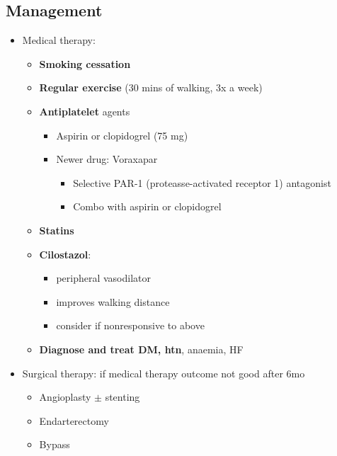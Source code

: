 \documentclass[
  12pt,
]{memoir}
\providecommand{\tightlist}{%
  \setlength{\itemsep}{0pt}\setlength{\parskip}{0pt}}
\begin{document}
\hypertarget{management-5}{%
\subsection{Management}\label{management-5}}

\begin{itemize}
\tightlist
\item
  Medical therapy:

  \begin{itemize}
  \tightlist
  \item
    \textbf{Smoking cessation}
  \item
    \textbf{Regular exercise} (30 mins of walking, 3x a week)
  \item
    \textbf{Antiplatelet} agents

    \begin{itemize}
    \tightlist
    \item
      Aspirin or clopidogrel (75 mg)
    \item
      Newer drug: Voraxapar

      \begin{itemize}
      \tightlist
      \item
        Selective PAR-1 (proteasse-activated receptor 1) antagonist
      \item
        Combo with aspirin or clopidogrel
      \end{itemize}
    \end{itemize}
  \item
    \textbf{Statins}
  \item
    \textbf{Cilostazol}:

    \begin{itemize}
    \tightlist
    \item
      peripheral vasodilator
    \item
      improves walking distance
    \item
      consider if nonresponsive to above
    \end{itemize}
  \item
    \textbf{Diagnose and treat DM, htn}, anaemia, HF
  \end{itemize}
\item
  Surgical therapy: if medical therapy outcome not good after 6mo

  \begin{itemize}
  \tightlist
  \item
    Angioplasty \(\pm\) stenting
  \item
    Endarterectomy
  \item
    Bypass
  \end{itemize}
\end{itemize}
\end{document}
